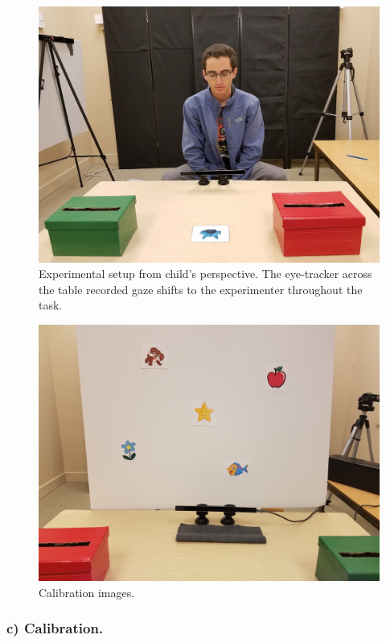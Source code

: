 \documentclass[floatsintext,man]{apa6}
\theoremstyle{definition}
\theoremstyle{definition}
\theoremstyle{definition}
\theoremstyle{remark}
\begin{document}
\begin{figure}
\centering
\includegraphics{../images/setup.jpg}
\caption{\label{fig:setup}Experimental setup from child's perspective. The
eye-tracker across the table recorded gaze shifts to the experimenter
throughout the task.}
\end{figure}

\begin{figure}
\centering
\includegraphics{../images/calibration.jpg}
\caption{\label{fig:calibration}Calibration images.}
\end{figure}

\subsubsection{c) Calibration.}\label{c-calibration.}
\end{document}

